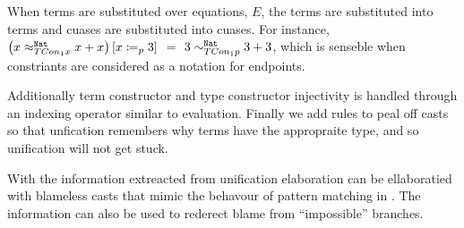 
When terms are substituted over equations, $E$, the terms are substituted into terms and cuases are substituted into cuases.
For instance, 
  $\left(x \approx_{TCon_{1}x}^{\mathtt{Nat}{}}x+x\right) \left[x\coloneqq_{p} 3\right]$ $=$ $3 \sim_{TCon_{1}p}^{\mathtt{Nat}{}}3+3$,
  which is senseble when constriants are considered as a notation for endpoints.

Additionally term constructor and type constructor injectivity is handled through an indexing operator similar to evaluation.
Finally we add rules to peal off casts so that unfication remembers why terms have the appropraite type, and so unification will not get stuck.

With the information extreacted from unification elaboration can be ellaboratied with blameless casts that mimic the behavour of pattern matching in .
The information can also be used to rederect blame from ``impossible'' branches.